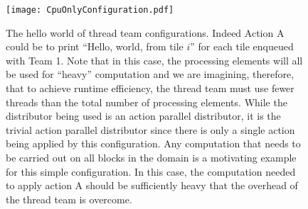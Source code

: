\documentclass{article}
\begin{document}
\begin{appendices}
\begin{figure}[!ht]
\begin{center}
\texttt{[image: CpuOnlyConfiguration.pdf]}
\caption[]{The hello world of thread team configurations.  Indeed Action A could
be to print ``Hello, world, from tile $i$'' for each tile enqueued with Team 1.
Note that in this case, the processing elements will all be used for ``heavy''
computation and we are imagining, therefore, that to achieve runtime efficiency,
the thread team must use fewer threads than the total number of processing
elements.  While the distributor being used is an action parallel distributor,
it is the trivial action parallel distributor since there is only a single
action being applied by this configuration.  Any computation that needs to be
carried out on all blocks in the domain is a motivating example for this simple
configuration.  In this case, the computation needed to apply action A should be
sufficiently heavy that the overhead of the thread team is overcome.}
\label{fig:CpuOnlyConfig}
\end{center}
\end{figure}


\end{appendices}
\end{document}
